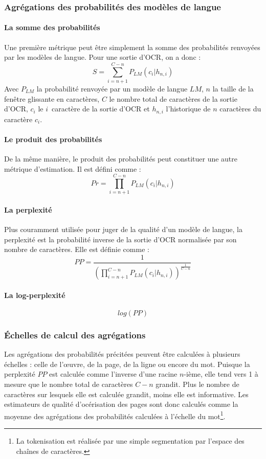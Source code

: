 \documentclass[10pt,twoside]{article}
\begin{document}
        
	   \subsubsection{Agrégations des probabilités des modèles de langue}\label{metrics}
	       \paragraph{La somme des probabilités}
	       Une première métrique peut être simplement la somme des probabilités renvoyées par les modèles de langue. Pour une
	       sortie d'OCR, on a donc : 
	       $$S = \sum_{i=n+1}^{C-n}P_{LM}(c_{i} | h_{n,i})$$
	       Avec $P_{LM}$ la probabilité renvoyée par un modèle de langue $LM$, $n$ 
	       la taille de la fenêtre glissante en caractères, $C$ le nombre total de caractères de la sortie d'OCR, $c_{i}$ 
	       le $i$\ieme~caractère de la sortie d'OCR et $h_{n,i}$ l'historique de $n$ caractères du caractère $c_{i}$.

	       \paragraph{Le produit des probabilités}
	       De la même manière, le produit des probabilités peut constituer une autre métrique d'estimation. Il est défini
	       comme :
	       $$Pr = \prod_{i=n+1}^{C-n}P_{LM}(c_{i} | h_{n,i})$$

	       \paragraph{La perplexité}
	       Plus couramment utilisée pour juger de la qualité d'un modèle de langue, la perplexité est la probabilité inverse de la sortie
	       d'OCR normalisée par son nombre de caractères. Elle est définie comme : 
	        $$PP = \frac{1}{(\prod_{i=n+1}^{C-n}P_{LM}(c_{i} | h_{n,i}))^{\frac{1}{C-n}}}$$

	       \paragraph{La log-perplexité}
	       $$log(PP)$$

	    \subsubsection{\'{E}chelles de calcul des agrégations}\label{echelle}
	    Les agrégations des probabilités précitées peuvent être calculées à plusieurs échelles : celle de l'\oe{}uvre, de la page, de la ligne 
	    ou encore du mot. Puisque la perplexité $PP$ est calculée comme l'inverse d'une racine $n$-ième, elle tend vers 1 à mesure que le nombre 
	    total de caractères $C - n$ grandit. Plus le nombre de caractères sur lesquels elle est calculée grandit, moins elle est informative. 
	    Les estimateurs de qualité d'océrisation des pages sont donc calculés comme la moyenne des agrégations des probabilités
	    calculées à l'échelle du mot\footnote{La tokenisation est réalisée par une simple segmentation par l'espace des chaînes de caractères.}.
\end{document}
